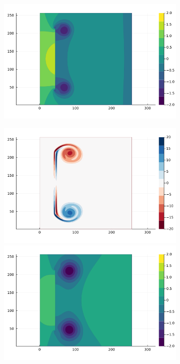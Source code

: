 \documentclass{article}
\begin{document}
\begin{figure}
\begin{subfigure}{.33\textwidth}
        \includegraphics[trim={4cm 1.5cm 5cm 7cm},clip,width=\textwidth]{tex/fig/Disk_biot_press_2.png}
    \end{subfigure}%
    \begin{subfigure}{.33\textwidth}
        \centering
         \includegraphics[trim={4cm 7.2cm 5cm 1cm},clip,width=\textwidth]{tex/fig/Disk_biot_omega_3.png}
        \includegraphics[trim={4cm 1.5cm 5cm 7cm},clip,width=\textwidth]{tex/fig/Disk_biot_press_3.png}

\end{subfigure}
\end{figure}
\end{document}

